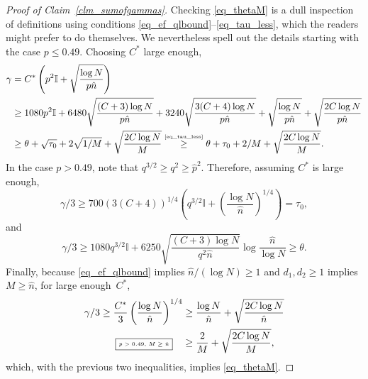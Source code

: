 \documentclass[12pt,reqno]{amsart}
\newcommand{\I} {\mathbb I}
\theoremstyle{definition}
\newcommand{\justify}[1]{\fbox{\tiny{#1}}\quad}
\newcommand{\By}[2]{\overset{\mbox{\tiny\ensuremath{#1}}}{#2}}
\begin{document}
\begin{proof}[Proof of Claim~\ref{clm_sumofgammas}]
Checking \eqref{eq_thetaM} is a dull inspection of definitions using conditions \eqref{eq_ef_qlbound}--\eqref{eq_tau_less}, which the readers might prefer to do themselves. We nevertheless spell out the details starting with the case $p\le 0.49$. Choosing $C^*$ large enough,
\begin{align*}
	\gamma &= C^*\left( p^2 \I +  \sqrt{\frac{\log N}{p\hat n }}\right) \\
	&\ge  1080 p^2 \I +  6480 \sqrt{\frac{(C + 3)\log N}{p\hat n }}
	+ 3240\sqrt{\frac{3(C + 4)\log N}{p\hat n}} + \sqrt{\frac{\log N}{p\hat n}} + \sqrt{\frac{2C\log N}{p\hat n}}\\
	&\ge \theta  + \sqrt{\tau_0} + 2\sqrt{1/M} + \sqrt{\frac{2C\log N}{M}} \By{\eqref{eq_tau_less}}{\ge}  \theta + \tau_0 + 2/M + \sqrt{\frac{2C\log N}{M}}.
\end{align*}
In the case $p > 0.49$, note that  $q^{3/2}\ge q^2\ge \hat p^2$.
Therefore, assuming $C^*$ is large enough,
\[
  \gamma/3 \ge 700\left(3(C+4)\right)^{1/4} \left( q^{3/2}\I + \left(\frac{\log N}{\hat n}\right)^{1/4}\right) = \tau_0,
\]
and
\[
\gamma/3 \ge  1080q^{3/2}\I +  6250\sqrt{\frac{(C + 3)\log N}{q^2\hat n}}\log\frac{\hat n}{\log N} \ge  \theta.
\]
Finally, because \eqref{eq_ef_qlbound} implies $\hat n / (\log N) \ge 1$ and $d_1, d_2 \ge 1$ implies $M \ge \hat n$, for large enough~$C^*$,
\begin{align*}
  \gamma/3 \ge \frac{C^*}{3}\left( \frac{\log N}{\hat n} \right)^{1/4} &\ge \frac{\log N}{\hat n} +  \sqrt{\frac{2C\log N}{\hat n}} \\
  \justify{$p > 0.49$, $M \ge \hat n$} & \ge \frac{2}{M} + \sqrt{\frac{2C\log N}{M}},
\end{align*}
which, with the previous two inequalities, implies \eqref{eq_thetaM}.
\end{proof}
\end{document}
